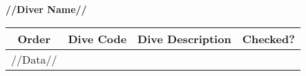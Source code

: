 \textbf{//Diver Name//}

\begin{table}[h]
		\centering
			\begin{tabularx}{\textwidth}{c c X X}
            Order&Dive Code&Dive Description&Checked?\\\midrule
            //Data//
		\end{tabularx}
	\end{table}

    \vspace{2cm}